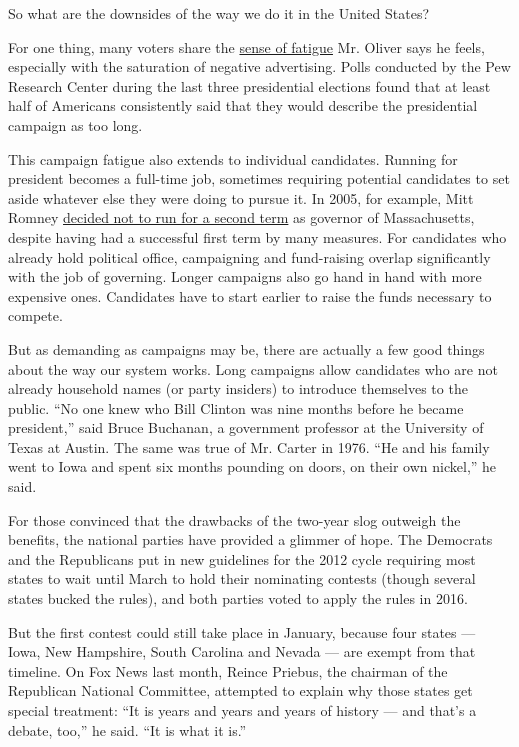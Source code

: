 So what are the downsides of the way we do it in the United States?

For one thing, many voters share the
\href{https://www.youtube.com/watch?v=OjrthOPLAKM\&feature=youtu.be}{sense
of fatigue} Mr. Oliver says he feels, especially with the saturation of
negative advertising. Polls conducted by the Pew Research Center during
the last three presidential elections found that at least half of
Americans consistently said that they would describe the presidential
campaign as too long.

This campaign fatigue also extends to individual candidates. Running for
president becomes a full-time job, sometimes requiring potential
candidates to set aside whatever else they were doing to pursue it. In
2005, for example, Mitt Romney
\href{http://www.nytimes3xbfgragh.onion/2005/12/15/national/15romney.html}{decided
not to run for a second term} as governor of Massachusetts, despite
having had a successful first term by many measures. For candidates who
already hold political office, campaigning and fund-raising overlap
significantly with the job of governing. Longer campaigns also go hand
in hand with more expensive ones. Candidates have to start earlier to
raise the funds necessary to compete.

But as demanding as campaigns may be, there are actually a few good
things about the way our system works. Long campaigns allow candidates
who are not already household names (or party insiders) to introduce
themselves to the public. ``No one knew who Bill Clinton was nine months
before he became president,'' said Bruce Buchanan, a government
professor at the University of Texas at Austin. The same was true of Mr.
Carter in 1976. ``He and his family went to Iowa and spent six months
pounding on doors, on their own nickel,'' he said.

For those convinced that the drawbacks of the two-year slog outweigh the
benefits, the national parties have provided a glimmer of hope. The
Democrats and the Republicans put in new guidelines for the 2012 cycle
requiring most states to wait until March to hold their nominating
contests (though several states bucked the rules), and both parties
voted to apply the rules in 2016.

But the first contest could still take place in January, because four
states --- Iowa, New Hampshire, South Carolina and Nevada --- are exempt
from that timeline. On Fox News last month, Reince Priebus, the chairman
of the Republican National Committee, attempted to explain why those
states get special treatment: ``It is years and years and years of
history --- and that's a debate, too,'' he said. ``It is what it is.''

